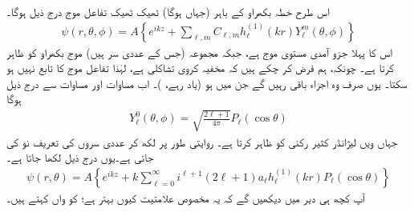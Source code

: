  اس طرح خطہ بکھراو کے باہر (جہاں  ہوگا) ٹھیک ٹھیک تفاعل موج درج ذیل ہوگا۔ 
\begin{align}
	\psi(r, \theta, \phi) = A\left\{e^{ikz}+\sum_{\ell, m}C_{\ell, m}h^{(1)}_{\ell}(kr)Y^m_{\ell}(\theta, \phi)\right\}
\end{align}
اس کا پہلا جزو آمدی مستوی موج ہے، جبکہ مجموعہ (جس کے عددی سر  ہیں) موج بکھراو کو ظاہر کرتا ہے۔ چونکہ، ہم فرض کر چکے ہیں کہ مخفیہ کروی تشاکلی ہے، لہٰذا تفاعل موج  کا تابع نہیں ہو سکتا۔ یوں صرف وہ اجزاء باقی رہیں گے جن میں  ہو (یاد رہے، )۔ اب مساوات  اور مساوات  سے درج ذیل ہوگا
\begin{align}
	Y^0_{\ell}(\theta, \phi) = \sqrt{\frac{2\ell+1}{4\pi}}P_{\ell}(\cos\theta)
\end{align}
جہاں  ویں لیژانڈر کثیر رکنی کو  ظاہر کرتا ہے۔ روایتی طور پر  لکھ کر عددی سروں کی تعریف نو کی جاتی ہے۔یوں درج ذیل لکھا جاتا ہے۔
\begin{align}\label{مساوات_بکھراو_بیرونی_حل}
	\psi(r, \theta) = A\left\{e^{ikz}+k\sum_{\ell=0}^{\infty}i^{\ell+1}(2\ell+1)a_{\ell}h_{\ell}^{(1)}(kr)P_{\ell}(\cos\theta)\right\}
\end{align}
آپ کچھ ہی دیر میں دیکھیں گے کہ یہ مخصوص علامتیت کیوں بہتر ہے؛  کو  واں  کہتے ہیں۔

